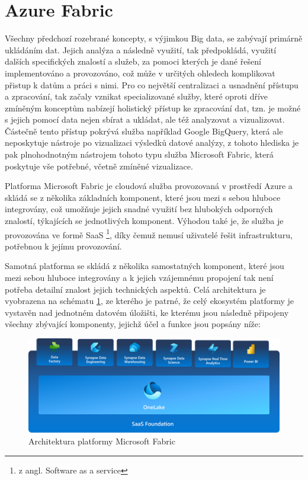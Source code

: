 \documentclass[
  digital,     %
  twoside,     %
  lof,         %
  lot,         %
]{fithesis4}
\begin{document}
\section{Azure Fabric}
Všechny předchozí rozebrané koncepty, s výjimkou Big data, se zabývají primárně ukládáním dat. Jejich analýza a následně využití, tak předpokládá, využití dalších specifických znalostí a služeb, za pomoci kterých je dané řešení implementováno a provozováno, což může v určitých ohledech komplikovat přistup k datům a práci s nimi. Pro co největší centralizaci a usnadnění přístupu a zpracování, tak začaly vznikat specializované služby, které oproti dříve zmíněným konceptům nabízejí holistický přístup ke zpracování dat, tzn. je možné s jejich pomocí data nejen sbírat a ukládat, ale též analyzovat a vizualizovat. Částečně  tento přístup pokrývá služba například  Google BigQuery, která ale neposkytuje nástroje po vizualizaci výsledků datové analýzy,\parencite{googleBigQuery} z tohoto hlediska je pak plnohodnotným nástrojem tohoto typu služba Microsoft Fabric, která poskytuje vše potřebné, včetně zmíněné vizualizace.\parencite{Buck2023}

Platforma Microsoft Fabric je cloudová služba provozovaná v prostředí Azure a skládá se z několika základních komponent, které jsou mezi s sebou hluboce integrovány, což umožňuje jejich snadné využití bez hlubokých odporných znalostí, týkajících se jednotlivých komponent. Výhodou také je, že služba je provozována ve formě SaaS \footnote{z angl. Software as a service}, díky čemuž nemusí uživatelé řešit infrastrukturu, potřebnou k jejímu provozování.\parencite{Buck2023}

Samotná platforma se skládá z několika samostatných komponent, které jsou mezi sebou hluboce integrovány a k jejich vzájemnému propojení tak není potřeba detailní znalost jejich technických aspektů. Celá architektura je vyobrazena na schématu \ref{fig:fabric_architecture}, ze kterého je patrné, že celý ekosystém platformy je vystavěn nad jednotném datovém úložišti, ke kterému jsou následně připojeny všechny zbývající komponenty, jejichž účel a funkce jsou popsány níže:


\begin{figure}[h]
  \begin{center}
          \includegraphics[width=12cm]{img/fabric.png}
  \end{center}
  \caption{Architektura platformy Microsoft Fabric \parencite{Buck2023}}
  \label{fig:fabric_architecture}
\end{figure}  
\end{document}
